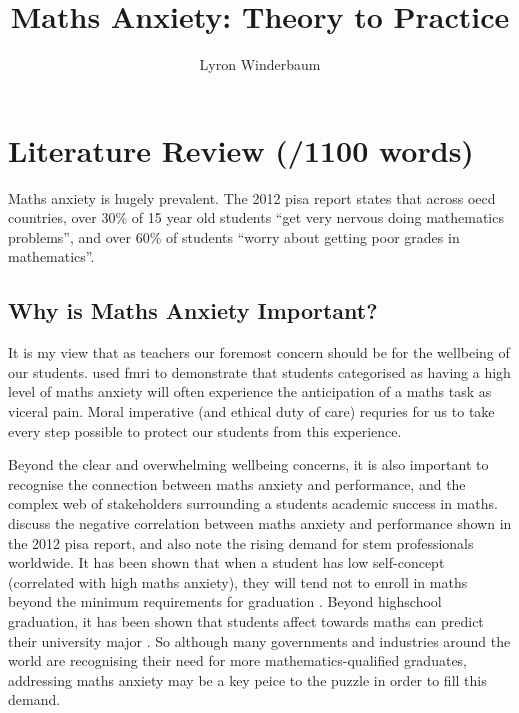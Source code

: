 \documentclass[14pt]{memoir}
\title{Maths Anxiety: Theory to Practice}
\author{Lyron Winderbaum}
\begin{document}
\maketitle



\begin{abstract}

\lipsum[1-2]

\end{abstract}


\glsresetall
\section*{Literature Review (/1100 words)}

Maths anxiety is hugely prevalent. The  2012 \gls{pisa} report states that across \gls{oecd} countries, over 30\% of 15 year old students ``get very nervous doing mathematics problems'', and over 60\% of students ``worry about getting poor grades in mathematics''. 

\subsection*{Why is Maths Anxiety Important?}

It is my view that as teachers our foremost concern should be for the wellbeing of our students.  used \gls{fmri} to demonstrate that students categorised as having a high level of maths anxiety will often experience the anticipation of a maths task as viceral pain. Moral imperative (and ethical duty of care) requries for us to take every step possible to protect our students from this experience.

Beyond the clear and overwhelming wellbeing concerns, it is also important to recognise the connection between maths anxiety and performance, and the complex web of stakeholders surrounding a students academic success in maths.  discuss the negative correlation between maths anxiety and performance shown in the 2012 \gls{pisa} \cite{PISA2013} report, and also note the rising demand for \gls{stem} professionals worldwide. It has been shown that when a student has low self-concept (correlated with high maths anxiety), they will tend not to enroll in maths beyond the minimum requirements for graduation \cite{Ashcraft2007}. Beyond highschool graduation, it has been shown that students affect towards maths can predict their university major \cite{LeFevre1992}. So although many governments and industries around the world are recognising their need for more mathematics-qualified graduates, addressing maths anxiety may be a key peice to the puzzle in order to fill this demand.
\end{document}
